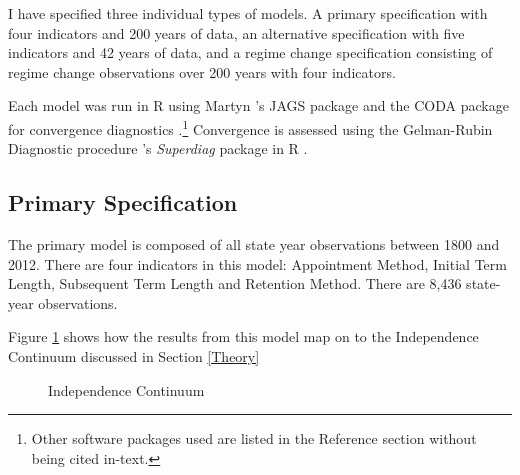 \documentclass[JohnsonMADraft2]{subfiles}
\begin{document}
\doublespacing

I have specified three individual types of models.  A primary specification with four indicators and 200 years of data, an alternative specification with five indicators and 42 years of data, and a regime change specification consisting of regime change observations over 200 years with four indicators.

Each model was run in R using Martyn \citeauthor{r-rjags}'s JAGS package and the CODA package for convergence diagnostics \cite{R,r-CODA}.\footnote{Other software packages used are listed in the Reference section without being cited in-text.}\nocite{R,r-CODA,r-Foreign,r-R2jags,r-ggplot2,r-dplyr,r-rjagsr-doParallel,r-rcurl,r-random,r-superdiag}  Convergence is assessed using the Gelman-Rubin Diagnostic procedure \citeauthor{r-superdiag}'s \textit{Superdiag} package in R \citep{Gelman1992,R}.

\subsection{Primary Specification}
The primary model is composed of all state year observations between 1800 and 2012.  There are four indicators in this model: Appointment Method, Initial Term Length, Subsequent Term Length and Retention Method.  There are 8,436 state-year observations.  

Figure \ref{continuumresults} shows how the results from this model map on to the Independence Continuum discussed in Section \ref{Theory}

\begin{figure}[tbh]\centering\caption{Independence Continuum}\label{continuumresults}
\end{figure} 
\end{document}
